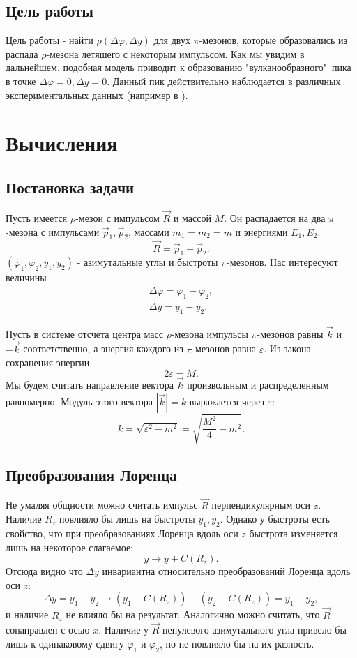 \documentclass[12pt]{article}
\renewcommand{\phi}{\varphi}
\def\Dphi{\Delta\phi}
\def\Dy{\Delta y}
\begin{document}
\subsection{Цель работы}
\qquad Цель работы - найти $\rho(\Dphi, \Dy)$ для двух $\pi$-мезонов, которые образовались из распада $\rho$-мезона летяшего с некоторым импульсом. Как мы увидим в дальнейшем, подобная модель приводит к образованию "вулканообразного"\ пика в точке $\Dphi = 0, \Dy = 0$. Данный пик действительно наблюдается в различных экспериментальных данных (например в \cite{exp_data}).

\section{Вычисления}
\subsection{Постановка задачи}
\qquad Пусть имеется $\rho$-мезон с импульсом $\vec R$ и массой $M$. Он распадается на два $\pi$-мезона с импульсами $\vec p_1, \vec p_2$, массами $m_1 = m_2 = m$ и энергиями $E_1, E_2$.
$$\vec R = \vec p_1 + \vec p_2.$$
$(\phi_1, \phi_2, y_1, y_2)$ - азимутальные углы и быстроты $\pi$-мезонов. Нас интересуют величины
\begin{gather*}
	\Dphi = \phi_1 - \phi_2,\\  
	\Dy = y_1 - y_2.
\end{gather*}

Пусть в системе отсчета центра масс $\rho$-мезона импульсы $\pi$-мезонов равны $\vec k$ и $-\vec k$ соответственно, а энергия каждого из $\pi$-мезонов равна $\varepsilon$. Из закона сохранения энергии
$$2\varepsilon = M.$$
Мы будем считать направление вектора $\vec k$ произвольным и распределенным равномерно. Модуль этого вектора $|\vec k| = k$ выражается через $\varepsilon$: 
$$k = \sqrt {\varepsilon^2 - m^2} = \sqrt{\frac{M^2}{4}-m^2}.$$  

\subsection{Преобразования Лоренца}
\qquad Не умаляя общности можно считать импульс $\vec R$ перпендикулярным оси $z$. Наличие $R_z$ повлияло бы лишь на быстроты $y_1, y_2$. Однако у быстроты есть свойство, что при преобразованиях Лоренца вдоль оси $z$ быстрота изменяется лишь на некоторое слагаемое:
$$y \rightarrow y + C(R_z).$$
Отсюда видно что $\Dy$ инвариантна относительно преобразований Лоренца вдоль оси $z$:
$$\Dy = y_1 - y_2 \rightarrow (y_1 - C(R_z)) - (y_2 - C(R_z)) = y_1 - y_2,$$
и наличие $R_z$ не влияло бы на результат. Аналогично можно считать, что $\vec R$ сонаправлен с осью $x$. Наличие у $\vec R$ ненулевого азимутального угла привело бы лишь к одинаковому сдвигу $\phi_1$ и $\phi_2$, но не повлияло бы на их разность.
\end{document}

